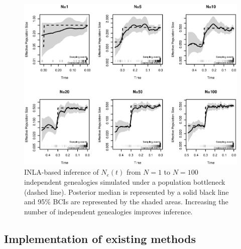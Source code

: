 \documentclass[english,titlepage]{article}
\begin{document}
\begin{figure}
\begin{center}
      \includegraphics[scale=0.8]{Figures/Bottle_20_independent.eps}    \end{center}
      \caption{\small{INLA-based inference of $N_{e}(t)$ from $N=1$ to $N=100$ independent genealogies simulated under a population bottleneck (dashed line). Posterior median is represented by a solid black line and 95\% BCIs are represented by the shaded areas. Increasing the number of independent genealogies improves inference.}}

\end{figure}
 





\subsection*{Implementation of existing methods}
\end{document}
